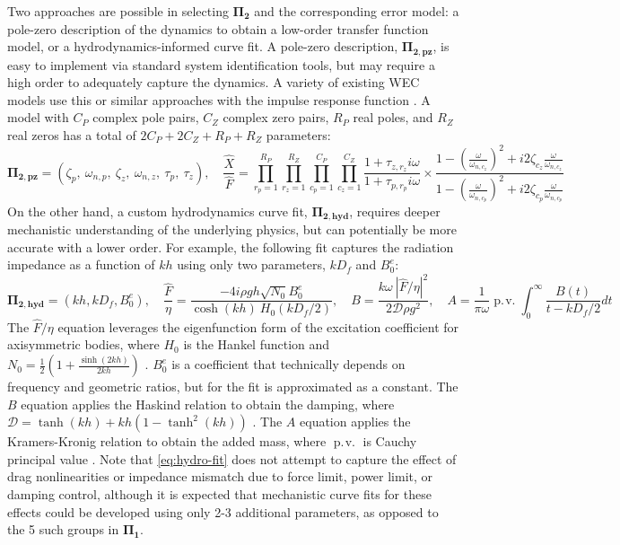 \documentclass[10pt,twoside]{article}
\begin{document}
Two approaches are possible in selecting $\mathbf{\Pi_2}$ and the corresponding error model: a pole-zero description of the dynamics to obtain a low-order transfer function model, or a hydrodynamics-informed curve fit.
A pole-zero description, $\mathbf{\Pi_{2,pz}}$, is easy to implement via standard system identification tools, but may require a high order to adequately capture the dynamics. 
A variety of existing WEC models use this \cite{bacelli_system_2017} or similar approaches with the impulse response function \cite{kristiansen_state-space_2005}. 
A model with $C_P$ complex pole pairs, $C_Z$ complex zero pairs, $R_P$ real poles, and $R_Z$ real zeros has a total of $2C_P+2C_Z+R_P+R_Z$ parameters:
\begin{equation}
    \mathbf{\Pi_{2,pz}} =  \left(
        \zeta_{p},~ \omega_{n,p},~
        \zeta_{z},~ \omega_{n,z},~
        \tau_{p},~ 
        \tau_{z} 
        \right),
    \quad
    \frac{\hat{X}}{\hat{F}} = 
    \prod_{r_p=1}^{R_P} 
    \prod_{r_z=1}^{R_Z} 
    \prod_{c_p=1}^{C_P}
    \prod_{c_z=1}^{C_Z}
    \frac{1+\tau_{z,r_z} i \omega}
         {1+\tau_{p,r_p} i \omega}  \times
    \frac{1-\left(\frac{\omega}{\omega_{n,c_z}}\right)^2 + i 2 \zeta_{c_z} \frac{\omega}{\omega_{n,c_z}}}
         {1-\left(\frac{\omega}{\omega_{n,c_p}}\right)^2 + i 2 \zeta_{c_p} \frac{\omega}{\omega_{n,c_p}}}
    \quad
\end{equation}
On the other hand, a custom hydrodynamics curve fit, $\mathbf{\Pi_{2,hyd}}$, requires deeper mechanistic understanding of the underlying physics, but can potentially be more accurate with a lower order. For example, the following fit captures the radiation impedance as a function of $kh$ using only two parameters, $kD_f$ and $B_0^e$:
\begin{equation}\label{eq:hydro-fit}
    \mathbf{\Pi_{2,hyd}} = (kh, kD_f, B_0^e),
    \quad
    \frac{\hat{F}}{\eta} = \frac{-4i\rho g h \sqrt{N_0}B_0^e}{\cosh(kh)~H_0(kD_f/2)},
    \quad
    B = \frac{k \omega~ |\hat{F}/\eta|^2}{2 \mathcal{D} \rho g^2},
    \quad
    A = \frac{1}{\pi \omega} \displaystyle \operatorname {p.\!v.}\int_0^\infty \frac{B(t)}{t-kD_f/2} dt
\end{equation}
The $\hat{F}/\eta$ equation leverages the eigenfunction form of the excitation coefficient for axisymmetric bodies, where $H_0$ is the Hankel function and $N_0=\frac{1}{2}\left(1+\frac{\sinh(2kh)}{2kh}  \right)$ \cite{chau_inertia_2012}.
$B_0^e$ is a coefficient that technically depends on frequency and geometric ratios, but for the fit is approximated as a constant.
The $B$ equation applies the Haskind relation to obtain the damping, where $\mathcal{D}=\tanh(kh)+kh(1-\tanh^2(kh))$ \cite{chau_inertia_2012}.
The $A$ equation applies the Kramers-Kronig relation to obtain the added mass, where $\operatorname {p.\!v.}$ is Cauchy principal value \cite{greenhow_added_1988}.
Note that \eqref{eq:hydro-fit} does not attempt to capture the effect of drag nonlinearities or impedance mismatch due to force limit, power limit, or damping control, although it is expected that mechanistic curve fits for these effects could be developed using only 2-3 additional parameters, as opposed to the 5 such groups in $\mathbf{\Pi_1}$.
\end{document}
